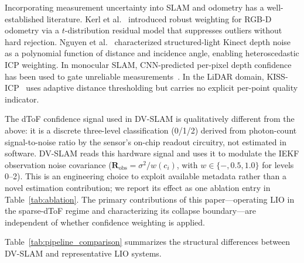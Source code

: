 Incorporating measurement uncertainty into SLAM and odometry has a
well-established literature.  Kerl et al.~\cite{kerl2013robust} introduced
robust weighting for RGB-D odometry via a $t$-distribution residual model
that suppresses outliers without hard rejection.  Nguyen et
al.~\cite{nguyen2012modeling} characterized structured-light Kinect depth
noise as a polynomial function of distance and incidence angle, enabling
heteroscedastic ICP weighting.  In monocular SLAM, CNN-predicted per-pixel
depth confidence has been used to gate unreliable measurements~\cite{tateno2017cnnslam}.
In the LiDAR domain, KISS-ICP~\cite{vizzo2023kiss} uses adaptive distance
thresholding but carries no explicit per-point quality indicator.

The dToF confidence signal used in DV-SLAM is qualitatively different from
the above: it is a discrete three-level classification (0/1/2) derived
from photon-count signal-to-noise ratio by the sensor's on-chip readout
circuitry, not estimated in software.  DV-SLAM reads this hardware signal
and uses it to modulate the IEKF observation noise covariance
($\mathbf{R}_\text{obs} = \sigma^2 / w(c_i)$, with $w \in \{-, 0.5, 1.0\}$
for levels 0--2).  This is an engineering choice to exploit available
metadata rather than a novel estimation contribution; we report its effect
as one ablation entry in Table~\ref{tab:ablation}.  The primary contributions
of this paper---operating LIO in the sparse-dToF regime and characterizing
its collapse boundary---are independent of whether confidence weighting is
applied.

Table~\ref{tab:pipeline_comparison} summarizes the structural differences
between DV-SLAM and representative LIO systems.

